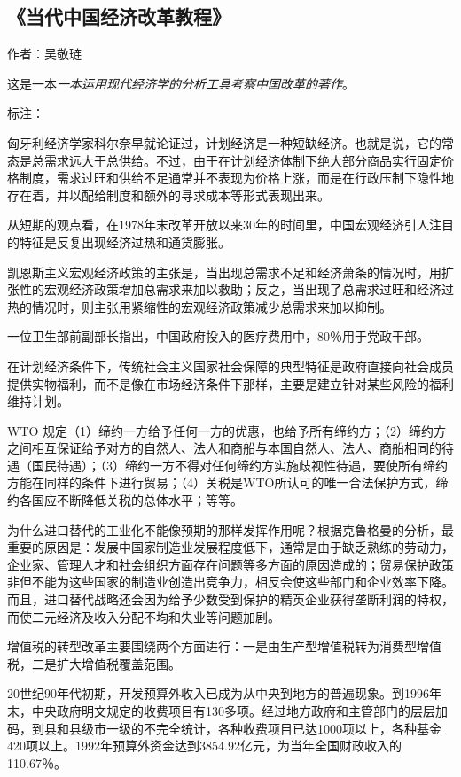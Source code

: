 \subsection{《当代中国经济改革教程》}
作者：吴敬琏

这是一本\emph{一本运用现代经济学的分析工具考察中国改革的著作}。

标注：
\begin{itemize*}
	\item 匈牙利经济学家科尔奈早就论证过，计划经济是一种短缺经济。也就是说，它的常态是总需求远大于总供给。不过，由于在计划经济体制下绝大部分商品实行固定价格制度，需求过旺和供给不足通常并不表现为价格上涨，而是在行政压制下隐性地存在着，并以配给制度和额外的寻求成本等形式表现出来。
	\item 从短期的观点看，在1978年末改革开放以来30年的时间里，中国宏观经济引人注目的特征是反复出现经济过热和通货膨胀。
	\item 凯恩斯主义宏观经济政策的主张是，当出现总需求不足和经济萧条的情况时，用扩张性的宏观经济政策增加总需求来加以救助；反之，当出现了总需求过旺和经济过热的情况时，则主张用紧缩性的宏观经济政策减少总需求来加以抑制。
	\item 一位卫生部前副部长指出，中国政府投入的医疗费用中，80％用于党政干部。
	\item 在计划经济条件下，传统社会主义国家社会保障的典型特征是政府直接向社会成员提供实物福利，而不是像在市场经济条件下那样，主要是建立针对某些风险的福利维持计划。
	\item WTO 规定（1）缔约一方给予任何一方的优惠，也给予所有缔约方；（2）缔约方之间相互保证给予对方的自然人、法人和商船与本国自然人、法人、商船相同的待遇（国民待遇）；（3）缔约一方不得对任何缔约方实施歧视性待遇，要使所有缔约方能在同样的条件下进行贸易；（4）关税是WTO所认可的唯一合法保护方式，缔约各国应不断降低关税的总体水平；等等。
	\item 为什么进口替代的工业化不能像预期的那样发挥作用呢？根据克鲁格曼的分析，最重要的原因是：发展中国家制造业发展程度低下，通常是由于缺乏熟练的劳动力，企业家、管理人才和社会组织方面存在问题等多方面的原因造成的；贸易保护政策非但不能为这些国家的制造业创造出竞争力，相反会使这些部门和企业效率下降。而且，进口替代战略还会因为给予少数受到保护的精英企业获得垄断利润的特权，而使二元经济及收入分配不均和失业等问题加剧。
	\item 增值税的转型改革主要围绕两个方面进行：一是由生产型增值税转为消费型增值税，二是扩大增值税覆盖范围。
	\item 20世纪90年代初期，开发预算外收入已成为从中央到地方的普遍现象。到1996年末，中央政府明文规定的收费项目有130多项。经过地方政府和主管部门的层层加码，到县和县级市一级的不完全统计，各种收费项目已达1000项以上，各种基金420项以上。1992年预算外资金达到3854.92亿元，为当年全国财政收入的110.67％。

\end{itemize*}
